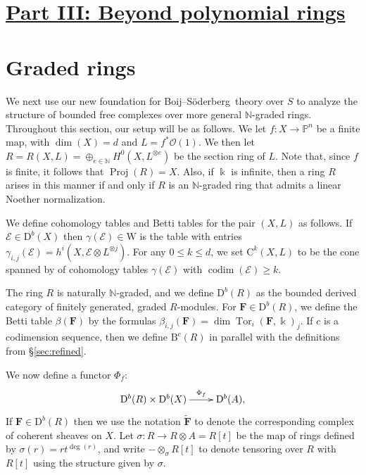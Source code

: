 \documentclass[12pt]{amsart}
\theoremstyle{definition}
\theoremstyle{remark}
\newcommand{\Proj}{\operatorname{Proj}}
\newcommand{\Tor}{\operatorname{Tor}}
\newcommand{\kk}{\Bbbk}
\newcommand{\codim}{\operatorname{codim}}
\newcommand{\PP}{\mathbb{P}}
\newcommand{\WW}{\mathrm{W}}
\newcommand{\NN}{\mathbb{N}}
\newcommand{\cc}{c}
\newcommand{\cO}{\mathcal{O}}
\newcommand{\cE}{\mathcal{E}}
\newcommand{\FF}{\mathbf{F}}
\newcommand{\DD}{\mathrm{D}}
\newcommand{\CQ}{\mathrm{C}}
\newcommand{\BBQ}{\mathrm{B}}
\def\BS{Boij--S\"oderberg~}
\begin{document}
\section*{\underline{{Part III: Beyond polynomial rings}}}
\section{Graded rings}\label{sec:functor}
We next use our new foundation for \BS theory over $S$ to analyze the structure of bounded free complexes over more general $\NN$-graded rings.  Throughout this section, our setup will be as follows.  We let $f\colon X\to \PP^n$ be a finite map, with $\dim(X)=d$ and $L=f^*\cO(1)$.  We then let $R=R(X,L)=\oplus_{e\in \mathbb N} H^0(X,L^{\otimes e})$ be the section ring of $L$.  Note that, since $f$ is finite, it follows that $\Proj(R)=X$.  Also, if $\kk$ is infinite, then a ring $R$ arises in this manner if and only if $R$ is an $\mathbb N$-graded ring that admits a linear Noether normalization.

We define cohomology tables and Betti tables for the pair $(X,L)$ as follows. If $\cE\in \DD^b(X)$ then $\gamma(\cE)\in \WW$ is the table with entries $\gamma_{i,j}(\cE)=h^i(X,\cE\otimes L^{\otimes j})$.  For any $0\leq k \leq d$, we set $\CQ^{k}(X,L)$ to be the cone spanned by of cohomology tables $\gamma(\cE)$ with $\codim(\cE)\geq k$.

The ring $R$ is naturally $\NN$-graded, and we define $\DD^b(R)$ as the bounded derived category of finitely generated, graded $R$-modules.  For $\FF\in \DD^b(R)$, we define the Betti table $\beta(\FF)$ by the formulas $\beta_{i,j}(\FF)=\dim \Tor_i(\FF,\kk)_j$.  If $\cc$ is a codimension sequence, then we define $\BBQ^{\cc}(R)$ in parallel with the definitions from \S\ref{sec:refined}.

We now define a functor $\Phi_f$:
\[
\xymatrix{\DD^{b}(R)\times \DD^{b}(X)  \ar[r]^-{\Phi_f}&\DD^{b}(A),}
\]
If $\FF \in \DD^b(R)$ then we use the notation $\widetilde{\FF}$ to denote the corresponding complex of coherent sheaves on $X$.
Let $\sigma: R\to R\otimes A=R[t]$ be the map of rings defined by $\sigma(r)=rt^{\deg(r)}$, and
write $-\otimes_\sigma R[t]$ to denote tensoring over $R$ with $R[t]$ using the structure
given by $\sigma$. 
\end{document}
